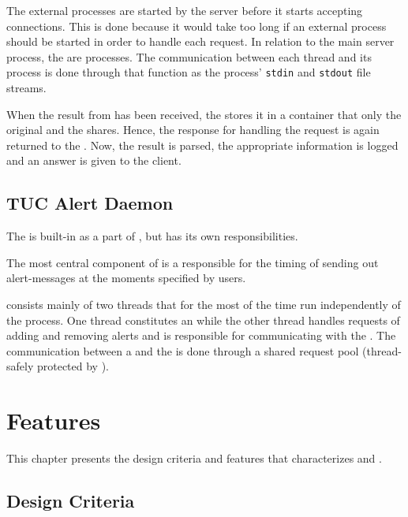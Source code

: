 \documentclass[a4paper,english,11pt,twoside,openright]{book}
\newcommand{\code}[1]{\texttt{#1}}
\begin{document}
The external  processes are started by the server before it
starts accepting connections.  This is done because it would take too
long if an external  process should be started in order to
handle each request.  In relation to the main server process, the
 are  processes.  The communication between each
 thread and its  process is done through
 that function as the  process' \code{stdin} and
\code{stdout} file streams.

When the result from  has been received, the  stores it in a  container that only the
original  and the  shares.
Hence, the response for handling the request is again returned to the
.  Now, the result is parsed, the appropriate
information is logged and an answer is given to the client.

\section{TUC Alert Daemon}
\label{sec:tuc-alert-daemon}

The  is built-in as a part of , but has its own
responsibilities.

The most central component of  is a 
responsible for the timing of sending out alert-messages at the
moments specified by users.

 consists mainly of two threads that for the most of the time
run independently of the  process.  One thread constitutes
an  while the other thread handles requests of
adding and removing alerts and is responsible for communicating with
the .  The communication between a  and the  is done through a
shared request pool (thread-safely protected by ).



\chapter{Features}
\label{cha:features}

This chapter presents the design criteria and features that
characterizes  and .

\section{Design Criteria}
\label{sec:design-criteria}
\end{document}
